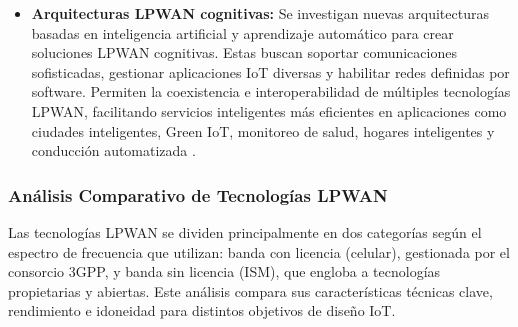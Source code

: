 \begin{itemize}
\begin{itemize}
                  \item \textbf{Arquitecturas LPWAN cognitivas:} Se investigan
                        nuevas arquitecturas basadas en inteligencia  artificial
                        y aprendizaje automático  para  crear  soluciones  LPWAN
                        cognitivas.   Estas   buscan   soportar   comunicaciones
                        sofisticadas,  gestionar  aplicaciones  IoT  diversas  y
                        habilitar redes  definidas  por  software.  Permiten  la
                        coexistencia   e    interoperabilidad    de    múltiples
                        tecnologías LPWAN,  facilitando  servicios  inteligentes
                        más   eficientes   en   aplicaciones    como    ciudades
                        inteligentes, Green IoT,  monitoreo  de  salud,  hogares
                        inteligentes       y       conducción       automatizada
                        \parencite[]{chilamkurthy2022low}.

            \end{itemize}

\end{itemize}


\subsubsection{Análisis Comparativo de Tecnologías LPWAN} Las tecnologías  LPWAN
se dividen principalmente en dos categorías según el espectro de frecuencia  que
utilizan: banda con licencia (celular), gestionada  por  el  consorcio  3GPP,  y
banda sin licencia (ISM), que engloba a  tecnologías  propietarias  y  abiertas.
Este  análisis  compara  sus  características  técnicas  clave,  rendimiento   e
idoneidad para distintos objetivos de diseño IoT.

